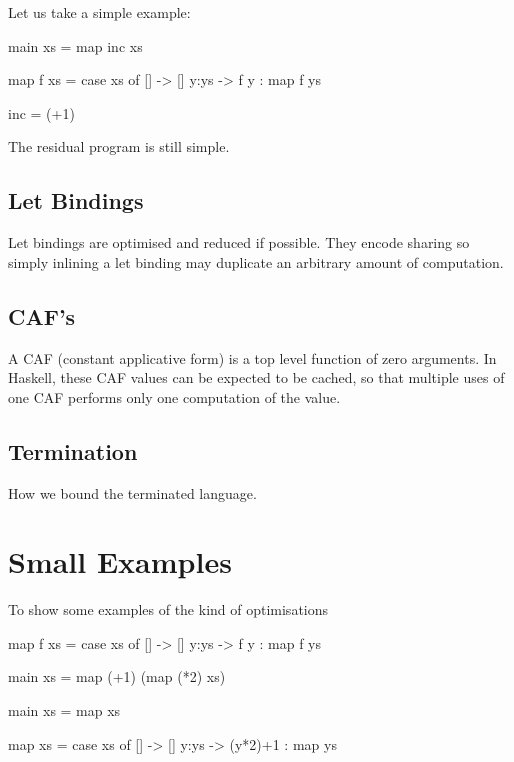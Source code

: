 \documentclass{llncs}
\begin{document}
Let us take a simple example:

\begin{code}
main xs = map inc xs

map f xs = case  xs of
                 []    -> []
                 y:ys  -> f y : map f ys

inc = (+1)
\end{code}

The residual program is still simple.

\subsection{Let Bindings}

Let bindings are optimised and reduced if possible. They encode sharing so simply inlining a let binding may duplicate an arbitrary amount of computation.

\subsection{CAF's}
\label{sec:caf}

A CAF (constant applicative form) is a top level function of zero arguments. In Haskell, these CAF values can be expected to be cached, so that multiple uses of one CAF performs only one computation of the value.


\subsection{Termination}

How we bound the terminated language.

\section{Small Examples}

To show some examples of the kind of optimisations

\begin{code}
map f xs = case  xs of
                 []    -> []
                 y:ys  -> f y : map f ys

main xs = map (+1) (map (*2) xs)
\end{code}

\begin{code}
main xs = map xs

map xs = case  xs of
               []    -> []
               y:ys  -> (y*2)+1 : map ys
\end{code}
\end{document}
